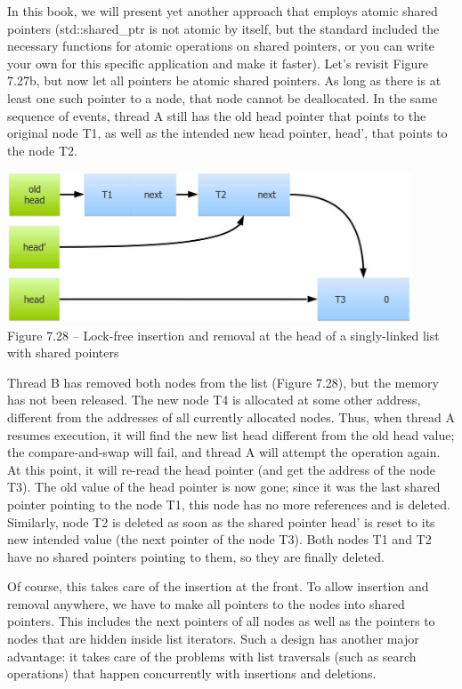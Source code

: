 In this book, we will present yet another approach that employs atomic shared pointers (std::shared\_ptr is not atomic by itself, but the standard included the necessary functions for atomic operations on shared pointers, or you can write your own for this specific application and make it faster). Let's revisit Figure 7.27b, but now let all pointers be atomic shared pointers. As long as there is at least one such pointer to a node, that node cannot be deallocated. In the same sequence of events, thread A still has the old head pointer that points to the original node T1, as well as the intended new head pointer, head', that points to the node T2. 

\begin{center}
\includegraphics[width=0.9\textwidth]{content/2/chapter7/images/28.jpg}\\
Figure 7.28 – Lock-free insertion and removal at the head of a singly-linked list with shared pointers
\end{center}

Thread B has removed both nodes from the list (Figure 7.28), but the memory has not been released. The new node T4 is allocated at some other address, different from the addresses of all currently allocated nodes. Thus, when thread A resumes execution, it will find the new list head different from the old head value; the compare-and-swap will fail, and thread A will attempt the operation again. At this point, it will re-read the head pointer (and get the address of the node T3). The old value of the head pointer is now gone; since it was the last shared pointer pointing to the node T1, this node has no more references and is deleted. Similarly, node T2 is deleted as soon as the shared pointer head' is reset to its new intended value (the next pointer of the node T3). Both nodes T1 and T2 have no shared pointers pointing to them, so they are finally deleted. 

Of course, this takes care of the insertion at the front. To allow insertion and removal anywhere, we have to make all pointers to the nodes into shared pointers. This includes the next pointers of all nodes as well as the pointers to nodes that are hidden inside list iterators. Such a design has another major advantage: it takes care of the problems with list traversals (such as search operations) that happen concurrently with insertions and deletions.


